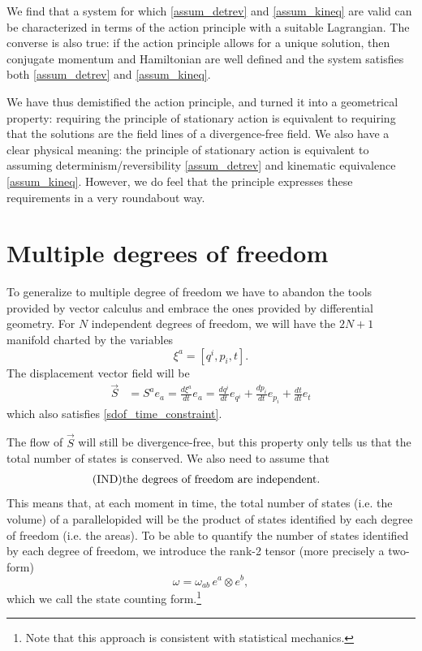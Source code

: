 \documentclass[10pt,twocolumn, nofootinbib]{revtex4-2}
\begin{document}
We find that a system for which \ref{assum_detrev} and \ref{assum_kineq} are valid can be characterized in terms of the action principle with a suitable Lagrangian. The converse is also true: if the action principle allows for a unique solution, then conjugate momentum and Hamiltonian are well defined and the system satisfies both \ref{assum_detrev} and \ref{assum_kineq}.

We have thus demistified the action principle, and turned it into a geometrical property: requiring the principle of stationary action is equivalent to requiring that the solutions are the field lines of a divergence-free field. We also have a clear physical meaning: the principle of stationary action is equivalent to assuming determinism/reversibility \ref{assum_detrev} and kinematic equivalence \ref{assum_kineq}. However, we do feel that the principle expresses these requirements in a very roundabout way.

\section{Multiple degrees of freedom}

To generalize to multiple degree of freedom we have to abandon the tools provided by vector calculus and embrace the ones provided by differential geometry. For $N$ independent degrees of freedom, we will have the $2N+1$ manifold charted by the variables
\begin{equation}\label{mdof_variables}
	\xi^a = [ q^i, p_i, t].
\end{equation}
The displacement vector field will be
\begin{equation}\label{mdof_displacement}
	\begin{aligned}
		\vec{S} &= S^a e_a = \frac{d\xi^a}{dt} e_a =\frac{dq^i}{dt} e_{q^i} + \frac{dp_i}{dt} e_{p_i} + \frac{dt}{dt} e_t
	\end{aligned}
\end{equation}
which also satisfies \ref{sdof_time_constraint}.

The flow of $\vec{S}$ will still be divergence-free, but this property only tells us that the total number of states is conserved. We also need to assume that
\begin{align}\label{assum_indep}
	\tag*{(IND)}
	\parbox{2.8in}{the degrees of freedom are independent.}
\end{align}
This means that, at each moment in time, the total number of states (i.e. the volume) of a parallelopided will be the product of states identified by each degree of freedom (i.e. the areas). To be able to quantify the number of states identified by each degree of freedom, we introduce the rank-2 tensor (more precisely a two-form)
\begin{equation}\label{mdof_form}
	\omega = \omega_{ab} \, e^a \otimes e^b,
\end{equation}
which we call the state counting form.\footnote{Note that this approach is consistent with statistical mechanics.}
\end{document}
